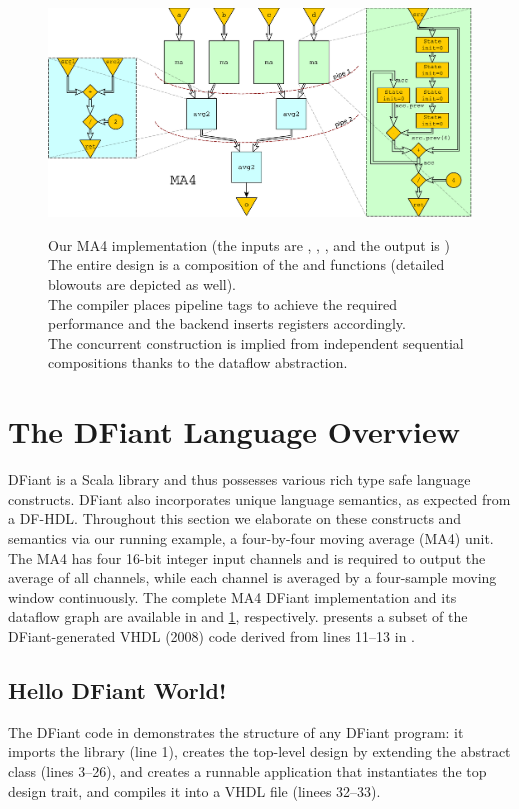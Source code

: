 \begin{figure}[t!]
\begin{minipage}[b][10cm][t]{0.34\linewidth}
  	\includegraphics[width=0.884\linewidth]{graphics/ma.pdf}
  	\captionsetup{justification=centering}
		\label{fig:MADraw}
  \end{minipage}%
  \captionsetup{justification=centering}      
  \caption{
		Our MA4 implementation (the inputs are , , ,  and the output is ) \\ 
		The entire design is a composition of the  and  functions (detailed blowouts are depicted as well). \\ 
		The compiler places pipeline tags to achieve the required performance and the backend inserts registers accordingly. \\
		The concurrent construction is implied from independent sequential compositions thanks to the dataflow abstraction. 
	}
\end{figure}

\section{The DFiant Language Overview}
\label{sec:dfiant}
DFiant is a Scala library and thus possesses various rich type safe language constructs. DFiant also incorporates unique language semantics, as expected from a DF-HDL. Throughout this section we elaborate on these constructs and semantics via our running example, a four-by-four moving average (MA4) unit. The MA4 has four 16-bit integer input channels and is required to output the average of all channels, while each channel is averaged by a four-sample moving window continuously. The complete MA4 DFiant implementation and its dataflow graph are available in  and \ref{fig:MADraw}, respectively.  presents a subset of the DFiant-generated VHDL (2008) code derived from lines 11--13 in .


\subsection{Hello DFiant World!}
The DFiant code in  demonstrates the structure of any DFiant program: it imports the  library (line 1), creates the top-level design by extending the  abstract class (lines 3--26), and creates a runnable application that instantiates the top design trait, and compiles it into a VHDL file (linees 32--33).

